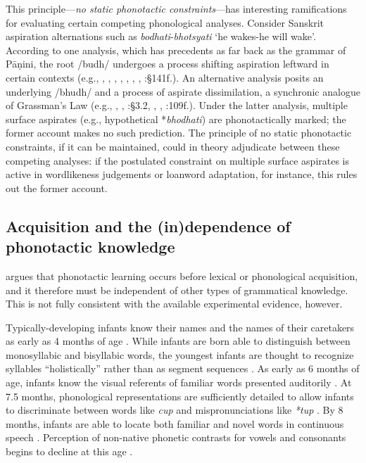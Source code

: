 This principle---\emph{no static phonotactic constraints}---has interesting ramifications for evaluating certain competing phonological analyses.
Consider Sanskrit aspiration alternations such as \emph{bodhati}-\emph{bhotsyati} `he wakes-he will wake'.
According to one analysis, which has precedents as far back as the grammar of Pāṇini, the root /budh/ undergoes a process shifting aspiration leftward in certain contexts (e.g., \citealt{Borowsky1983}, \citealt{Hoenigswald1965}, \citealt{Kaye1985}, \citealt{Sag1974}, \citeyear{Sag1976}, \citealt{Schindler1976}, \citealt{Stemberger1980}, \citealt{Whitney1889}:\S141f.).
An alternative analysis posits an underlying /bhudh/ and a process of aspirate dissimilation, a synchronic analogue of Grassman's Law (e.g., \citealt{Anderson1970}, \citealt{Hoard1975}, \citealt{Kiparsky1965}:\S3.2, \citealt{Phelps1973}, \citealt{Phelps1975b}, \citealt{Zwicky1965}:109f.).
Under the latter analysis, multiple surface aspirates (e.g., hypothetical *\emph{bhodhati}) are phonotactically marked; the former account makes no such prediction.
The principle of no static phonotactic constraints, if it can be maintained, could in theory adjudicate between these competing analyses: if the postulated constraint on multiple surface aspirates is active in wordlikeness judgements or loanword adaptation, for instance, this rules out the former account.

\subsection{Acquisition and the (in)dependence of phonotactic knowledge}
\label{ss:aerbpp}

\citet{Hayes2004b} argues that phonotactic learning occurs before lexical or phonological acquisition, and it therefore must be independent of other types of grammatical knowledge.
This is not fully consistent with the available experimental evidence, however.

Typically-developing infants know their names and the names of their caretakers as early as 4 months of age \citep{Bortfeld2005,Mandel1995,Tincoff1999}.
While infants are born able to distinguish between monosyllabic and bisyllabic words, the youngest infants are thought to recognize syllables ``holistically'' rather than as segment sequences \citep{Bertoncini1981,Eimas1999,Jusczyk1987}.
As early as 6 months of age, infants know the visual referents of familiar words presented auditorily \citep{Bergelson2012}.
At 7.5 months, phonological representations are sufficiently detailed to allow infants to discriminate between words like \emph{cup} and mispronunciations like \emph{*tup} \citep{Jusczyk1995}.
By 8 months, infants are able to locate both familiar and novel words in continuous speech \citep{Jusczyk1997,Seidl2006}.
Perception of non-native phonetic contrasts for vowels and consonants begins to decline at this age \citep{Best1994,Polka1994,Werker1981,Werker1984,Werker1988}.

